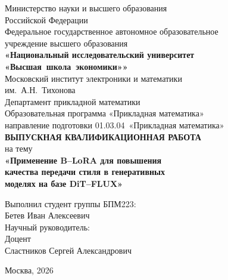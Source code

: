 \documentclass[14pt,a4paper]{extarticle}
\begin{document}
\begin{titlepage}
    \begin{center}
        \large
        Министерство науки и высшего образования\\
        Российской Федерации\\[0.5em]
        Федеральное государственное автономное образовательное\\
        учреждение высшего образования\\[0.5em]
        \textbf{«Национальный исследовательский университет\\
        \mbox{«Высшая школа экономики»}»}\\[1.5em]

        \normalsize
        Московский институт электроники и математики\\
        им.~А.Н.~Тихонова\\[0.3em]
        Департамент прикладной математики\\[2em]

        \large
        Образовательная программа «Прикладная математика»\\
        направление подготовки 01.03.04~«Прикладная математика»\\[2em]

        \textbf{ВЫПУСКНАЯ КВАЛИФИКАЦИОННАЯ РАБОТА}\\[1em]

        на тему\\[0.5em]
        \Large\textbf{«Применение B–LoRA для повышения\\
        качества передачи стиля в генеративных\\
        моделях на базе DiT–FLUX»}\\[2em]

        \large
        \begin{flushright}
            Выполнил студент группы БПМ223:\\
            Бетев Иван Алексеевич\\[1.5em]
            Научный руководитель:\\
            Доцент\\
            Сластников Сергей Александрович\\
        \end{flushright}

        \vfill
        Москва, 2026
    \end{center}
\end{titlepage}
\end{document}
